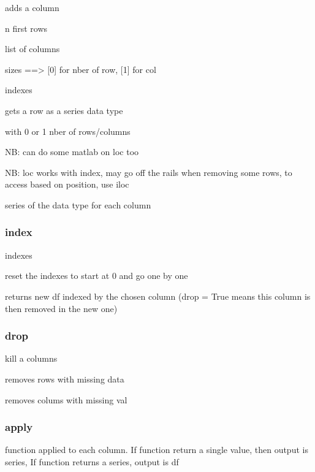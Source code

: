 			 adds a column

			 n first rows

			 list of columns

			 sizes  ==> [0] for nber of row, [1] for col

			 indexes

			 gets a row as a series data type

			 with 0 or 1 nber of rows/columns

			NB: can do some matlab on loc too

			NB: loc works with index, may go off the rails when removing some rows, to access based on position, use iloc 

			 series of the data type for each column


		\subsubsection{index}
			
			 indexes

			 reset the indexes to start at 0 and go one by one

			 returns new df indexed by the chosen column (drop = True means this column  is then removed in the new one)

		\subsubsection{drop}

			 kill a columns

			 removes rows with missing data


			 removes colums with missing val


		\subsubsection{apply}
			
			 function applied to each column. If function return a single value, then output is series, If function returns a series, output is df

